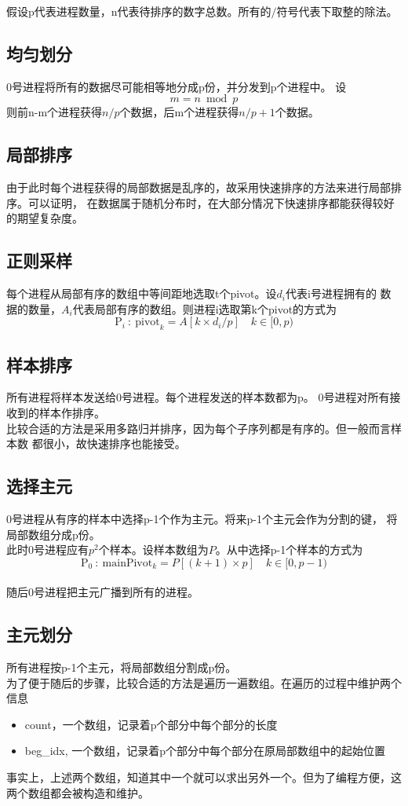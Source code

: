 \documentclass[a4paper]{article}
\begin{document}
假设p代表进程数量，n代表待排序的数字总数。所有的$/$符号代表下取整的除法。
\subsection{均匀划分}\label{subsec:st1}
0号进程将所有的数据尽可能相等地分成p份，并分发到p个进程中。
设$$m = n \bmod p$$
则前n-m个进程获得$n/p$个数据，后m个进程获得$n/p + 1$个数据。
\subsection{局部排序}\label{subsec:localsort}
由于此时每个进程获得的局部数据是乱序的，故采用快速排序的方法来进行局部排序。可以证明，
在数据属于随机分布时，在大部分情况下快速排序都能获得较好的期望复杂度。
\subsection{正则采样}
每个进程从局部有序的数组中等间距地选取t个pivot。设$d_i$代表i号进程拥有的
数据的数量，$A_i$代表局部有序的数组。则进程i选取第k个pivot的方式为
$$\text{P}_i \ : \ \text{pivot}_k = A[k \times d_i / p] \quad k \in [0, p)$$
\subsection{样本排序}
所有进程将样本发送给0号进程。每个进程发送的样本数都为p。
0号进程对所有接收到的样本作排序。\\

比较合适的方法是采用多路归并排序，因为每个子序列都是有序的。但一般而言样本数
都很小，故快速排序也能接受。
\subsection{选择主元}
0号进程从有序的样本中选择p-1个作为主元。将来p-1个主元会作为分割的键，
将局部数组分成p份。\\

此时0号进程应有$p^2$个样本。设样本数组为$P$。从中选择p-1个样本的方式为
$$\text{P}_0\ :\ \text{mainPivot}_k = P[(k + 1) \times p] \quad k \in [0, p - 1)$$
\\
随后0号进程把主元广播到所有的进程。
\subsection{主元划分}\label{subsec:mpdiv}
所有进程按p-1个主元，将局部数组分割成p份。\\

为了便于随后的步骤，比较合适的方法是遍历一遍数组。在遍历的过程中维护两个信息
\begin{itemize}
    \item count，一个数组，记录着p个部分中每个部分的长度
    \item beg\_idx, 一个数组，记录着p个部分中每个部分在原局部数组中的起始位置
\end{itemize}
事实上，上述两个数组，知道其中一个就可以求出另外一个。但为了编程方便，这两个数组都会被构造和维护。
\end{document}
